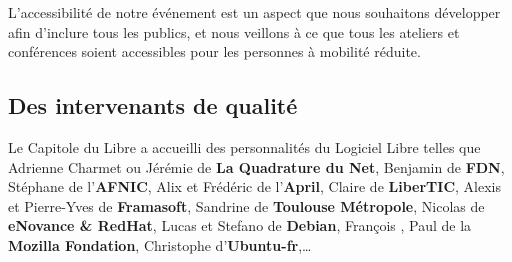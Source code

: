 \Separateur

L'accessibilité de notre événement est un aspect que nous souhaitons 
développer afin d'inclure tous les publics, et nous veillons à ce que 
tous les ateliers et conférences soient accessibles pour les personnes 
à mobilité réduite.

\subsection{Des intervenants de qualité}

Le Capitole du Libre a accueilli des personnalités du Logiciel Libre 
telles que Adrienne Charmet ou Jérémie  de \textbf{La 
Quadrature du Net}, Benjamin  de \textbf{FDN}, Stéphane 
 de l'\textbf{AFNIC}, Alix  et Frédéric 
 de l'\textbf{April}, Claire  de 
\textbf{LiberTIC}, Alexis  et Pierre-Yves  
de \textbf{Framasoft}, Sandrine  de \textbf{Toulouse 
Métropole}, Nicolas  de \textbf{eNovance \& RedHat}, Lucas 
 et Stefano  de \textbf{Debian}, 
François , Paul  de la \textbf{Mozilla 
Fondation}, Christophe  d'\textbf{Ubuntu-fr},\dots
